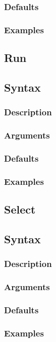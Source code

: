 \documentclass[11pt]{article}
\begin{document}
\begin{itemize}
		\subsubsection{Defaults}
		\subsubsection{Examples}
	
	\subsection{Run}
		\subsection{Syntax}
		\subsubsection{Description}
		\subsubsection{Arguments}
		\subsubsection{Defaults}
		\subsubsection{Examples}
	
	\subsection{Select}
		\subsection{Syntax}
		\subsubsection{Description}
		\subsubsection{Arguments}
		\subsubsection{Defaults}
		\subsubsection{Examples}
	

\end{itemize}
\end{document}
